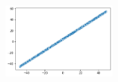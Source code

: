 \begin{problema}
\begin{enumerate}
\begin{sol}
\begin{figure}[H]
\begin{subfigure}{.5\textwidth}
				\end{subfigure}%
				\begin{subfigure}{.5\textwidth}
					\centering
					\includegraphics[width=0.45\textwidth]{Images/2.2}
				\end{subfigure}
			\end{figure}
		\end{sol}
	\end{enumerate}

\end{problema}

